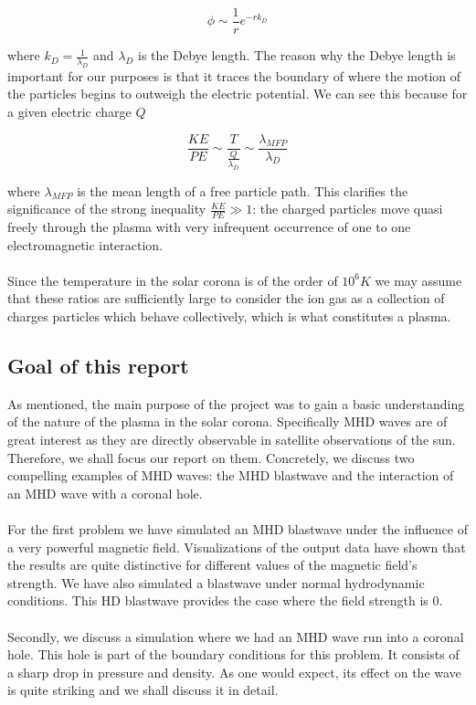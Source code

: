 $$ \phi  \sim \frac{1}{r} e^{-r k_D}$$

where $k_D = \frac{1}{\lambda_D}$ and $ \lambda_D $ is the Debye length. The reason why the Debye length is important for our purposes is that it traces the boundary of where the motion of the particles begins to outweigh the electric potential. We can see this because for a given electric charge $Q$ 

$$ \frac{KE}{PE}  \sim \frac{T}{\frac{Q}{\lambda_D}}  \sim \frac{\lambda_{MFP}}{\lambda_D} $$

where $\lambda_{MFP}$ is the mean length of a free particle path. This clarifies the significance of the strong inequality $\frac{KE}{PE} \gg 1$: the charged particles move quasi freely through the plasma with very infrequent occurrence of one to one electromagnetic interaction.\\
\\
Since the temperature in the solar corona is of the order of $10^6 K$ we may assume that these ratios are sufficiently large to consider the ion gas as a collection of charges particles which behave collectively, which is what constitutes a plasma. \cite{notes-principles-MHD}

\subsection*{Goal of this report}

As mentioned, the main purpose of the project was to gain a basic understanding of the nature of the plasma in the solar corona. Specifically MHD waves are of great interest as they are directly observable in satellite observations of the sun. Therefore, we shall focus our report on them. Concretely, we discuss two compelling examples of MHD waves: the MHD blastwave and the interaction of an MHD wave with a coronal hole.\\
\\
For the first problem we have simulated an MHD blastwave under the influence of a very powerful magnetic field. Visualizations of the output data have shown that the results are quite distinctive for different values of the magnetic field's strength. We have also simulated a blastwave under normal hydrodynamic conditions. This HD blastwave provides the case where the field strength is $0$.\\
\\
Secondly, we discuss a simulation where we had an MHD wave run into a coronal hole. This hole is part of the boundary conditions for this problem. It consists of a sharp drop in pressure and density. As one would expect, its effect on the wave is quite striking and we shall discuss it in detail. 

